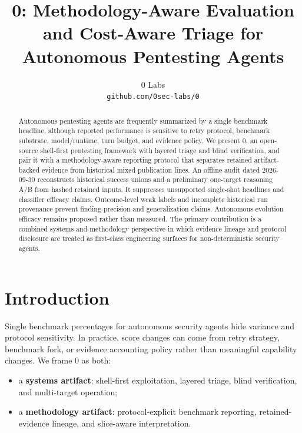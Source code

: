 \documentclass[11pt]{article}
\title{0: Methodology-Aware Evaluation and Cost-Aware Triage for Autonomous Pentesting Agents}
\author{
  0 Labs \\
  \texttt{github.com/0sec-labs/0}
}
\date{}
\begin{document}
\maketitle

\begin{abstract}
Autonomous pentesting agents are frequently summarized by a single benchmark
headline, although reported performance is sensitive to retry protocol,
benchmark substrate, model/runtime, turn budget, and evidence policy. We
present 0, an open-source shell-first pentesting framework with layered
triage and blind verification, and pair it with a methodology-aware reporting
protocol that separates retained artifact-backed evidence from historical mixed
publication lines. An offline audit dated 2026-09-30 reconstructs historical success unions
and a preliminary one-target reasoning A/B from hashed retained inputs.
It suppresses unsupported single-shot headlines and classifier efficacy
claims. Outcome-level weak labels and incomplete historical run provenance
prevent finding-precision and generalization claims. Autonomous evolution
efficacy remains proposed rather than measured.
The primary contribution is a combined systems-and-methodology perspective in
which evidence lineage and protocol disclosure are treated as first-class
engineering surfaces for non-deterministic security agents.
\end{abstract}

\section{Introduction}

Single benchmark percentages for autonomous security agents hide variance and
protocol sensitivity. In practice, score changes can come from retry strategy,
benchmark fork, or evidence accounting policy rather than meaningful capability
changes. We frame 0 as both:

\begin{itemize}[leftmargin=*]
  \item a \textbf{systems artifact}: shell-first exploitation, layered triage,
  blind verification, and multi-target operation;
  \item a \textbf{methodology artifact}: protocol-explicit benchmark reporting,
  retained-evidence lineage, and slice-aware interpretation.
\end{itemize}
\end{document}
